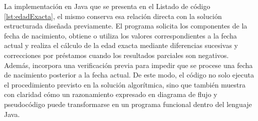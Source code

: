 \documentclass[12pt,twoside]{book}
\begin{document}
					La implementación en Java que se presenta en el Listado de código \ref{lst:edadExacta}, el mismo conserva esa relación directa con la solución estructurada diseñada previamente. El programa solicita los componentes de la fecha de nacimiento, obtiene o utiliza los valores correspondientes a la fecha actual y realiza el cálculo de la edad exacta mediante diferencias sucesivas y correcciones por préstamos cuando los resultados parciales son negativos. Además, incorpora una verificación previa para impedir que se procese una fecha de nacimiento posterior a la fecha actual. De este modo, el código no solo ejecuta el procedimiento previsto en la solución algorítmica, sino que también muestra con claridad cómo un razonamiento expresado en diagrama de flujo y pseudocódigo puede transformarse en un programa funcional dentro del lenguaje Java.
					
\end{document}
